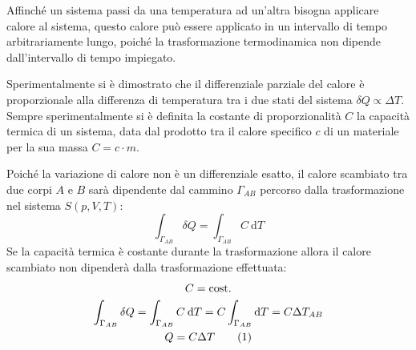 \documentclass{article}
\newcommand{\df}{\mathrm{d}}
\numberwithin{equation}{subsection}
\begin{document}
Affinché un sistema 
passi da una temperatura ad un'altra bisogna applicare calore 
al sistema, questo calore può essere applicato in un intervallo 
di tempo arbitrariamente lungo, poiché la trasformazione 
termodinamica non dipende dall'intervallo di tempo impiegato. 



Sperimentalmente si è dimostrato che il differenziale parziale 
del calore è proporzionale alla differenza di temperatura tra i 
due stati del sistema $\delta Q \propto\Delta T$. Sempre 
sperimentalmente si è definita la costante di proporzionalità 
$C$ la capacità termica di un sistema, data dal prodotto tra il 
calore specifico $c$ di un materiale per la sua massa $C=c\cdot m$. 


Poiché la variazione di calore non è un 
differenziale esatto, il calore scambiato tra due corpi $A$ e $B$ 
sarà 
dipendente dal cammino $\Gamma_{AB}$ percorso dalla trasformazione nel 
sistema $S(p,V,T)$:
\begin{equation}
    \displaystyle\int_{\Gamma_{AB}}\delta Q =\int_{\Gamma_{AB}}C\:\df T
\end{equation}
Se la capacità termica è costante durante la trasformazione 
allora il calore scambiato non dipenderà dalla trasformazione 
effettuata:
\begin{gather*}
    C=\mathrm{cost.}\\
    \displaystyle\int_{\Gamma_{AB}}\delta Q =\int_{\Gamma_{AB}}C\:\df T=C\int_{\Gamma_{AB}}\df T=C\Delta T_{AB}\\
    Q=C\Delta T\tag{\stepcounter{equation}\theequation}
\end{gather*}
\end{document}

